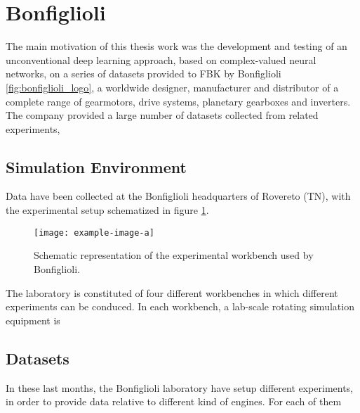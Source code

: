\documentclass[../main.tex]{subfiles}
\begin{document}
 






\section{Bonfiglioli}

The main motivation of this thesis work was the development and testing of an unconventional deep learning approach, based on complex-valued neural networks, on a series of datasets provided to FBK by Bonfiglioli \ref{fig:bonfiglioli_logo}, a worldwide designer, manufacturer and distributor of a complete range of gearmotors, drive systems, planetary gearboxes and inverters.\\
The company provided a large number of datasets collected from related experiments, 




\subsection{Simulation Environment}

Data have been collected at the Bonfiglioli headquarters of Rovereto (TN), with the experimental setup schematized in figure \ref{fig:bonfiglioli_scheme_workbench}.
\begin{figure}[!ht]
	\centering
	\texttt{[image: example-image-a]}
	\caption{Schematic representation of the experimental workbench used by Bonfiglioli.}
	\label{fig:bonfiglioli_scheme_workbench}	
\end{figure}
The laboratory is constituted of four different workbenches in which different experiments can be conduced. In each workbench, a lab-scale rotating simulation equipment is 


\subsection{Datasets}

In these last months, the Bonfiglioli laboratory have setup different experiments, in order to provide data relative to different kind of engines. For each of them
\end{document}

